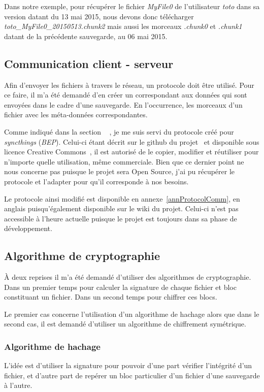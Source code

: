 \documentclass[a4paper,10pt, twoside]{report}
\begin{document}
\begin{spacing}{1.2}
Dans notre exemple, pour récupérer le fichier \textit{MyFile0} de
l'utilisateur \textit{toto}  dans sa version datant du 13 mai 2015, nous devons
donc télécharger \textit{toto\_MyFile0\_20150513.chunk2} mais aussi les
morceaux \textit{.chunk0} et \textit{.chunk1} datant de la précédente
sauvegarde, au 06 mai 2015.

\subsection{Communication client - serveur}
Afin d'envoyer les fichiers à travers le réseau, un protocole doit être
utilisé. Pour ce faire, il m'a été demandé d'en créer un correspondant
aux données qui sont envoyées dans le cadre d'une sauvegarde. En l'occurrence,
les morceaux d'un fichier avec les méta-données correspondantes.

Comme indiqué dans la section \flqq~ \frqq, je me
suis servi du protocole créé pour \textit{syncthings} (\textit{BEP}).
Celui-ci étant décrit sur le github du projet~\cite{refBEP} et
disponible sous licence Creative Commons~\cite{refCC4.0}, il est autorisé de
le copier, modifier et réutiliser pour n'importe quelle utilisation, même
commerciale. Bien que ce dernier point ne nous concerne pas puisque le projet
sera Open Source, j'ai pu récupérer le protocole et l'adapter pour qu'il
corresponde à nos besoins.

Le protocole ainsi modifié est disponible en annexe~\ref{annProtocolComm}, en
anglais puisqu'également disponible sur le wiki du projet. Celui-ci n'est pas
accessible à l'heure actuelle puisque le projet est toujours dans sa phase de
développement.

\subsection{Algorithme de cryptographie}
À deux reprises il m'a été demandé d'utiliser des algorithmes de
cryptographie. Dans un premier temps pour calculer la signature de chaque
fichier et bloc constituant un fichier. Dans un second temps pour chiffrer
ces blocs.

Le premier cas concerne l'utilisation d'un algorithme de hachage alors que dans
le second cas, il est demandé d'utiliser un algorithme de chiffrement
symétrique.

\subsubsection{Algorithme de hachage}
L'idée est d'utiliser la signature pour pouvoir d'une part vérifier
l'intégrité d'un fichier, et d'autre part de repérer un bloc particulier d'un
fichier d'une sauvegarde à l'autre.


\end{spacing}
\end{document}
